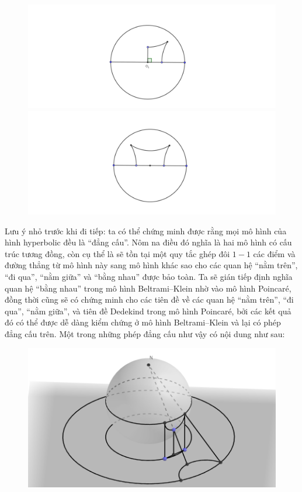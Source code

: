 \begin{multicols}{2}
\begin{figure}[H]
		\includegraphics[height= 0.43\linewidth]{Tu_giac_Lambert.pdf}
		\includegraphics[height= 0.43\linewidth]{Tu_giac_Saccheri.pdf}
		\vspace*{-15pt}
	\end{figure}
	Lưu ý nhỏ trước khi đi tiếp: ta có thể chứng minh được rằng mọi mô hình của hình hyperbolic đều là ``đẳng cấu''. Nôm na điều đó nghĩa là hai mô hình có cấu trúc tương đồng, còn cụ thể là sẽ tồn tại một quy tắc ghép đôi $1-1$ các điểm và đường thẳng từ mô hình này sang mô hình khác sao cho các quan hệ ``nằm trên'', ``đi qua'', ``nằm giữa'' và ``bằng nhau'' được bảo toàn. Ta sẽ gián tiếp định nghĩa quan hệ ``bằng nhau'' trong mô hình Beltrami--Klein nhờ vào mô hình Poincaré, đồng thời cũng sẽ có chứng minh cho các tiên đề về các quan hệ ``nằm trên'', ``đi qua'', ``nằm giữa'', và tiên đề Dedekind trong mô hình Poincaré, bởi các kết quả đó có thể được dễ dàng kiểm chứng ở mô hình Beltrami--Klein và lại có phép đẳng cấu trên. Một trong những phép đẳng cấu như vậy có nội dung như sau:
	\begin{figure}[H]
		\vspace*{-10pt}
		\centering
		\captionsetup{labelformat= empty, justification=centering}
		\includegraphics[width= 1\linewidth]{Klein_sang_Poincare.png}

\end{figure}
\end{multicols}
